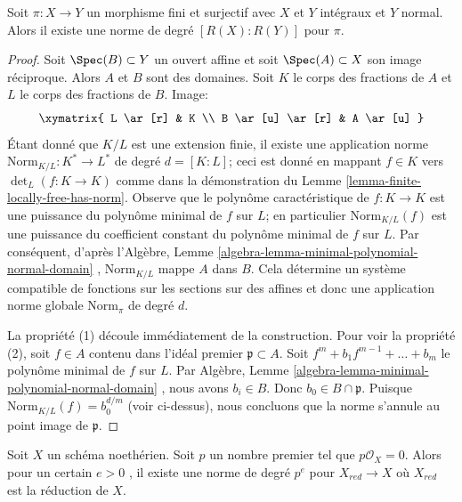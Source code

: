 \begin{lemma}
\label{lemma-norm-in-normal-case}
Soit  $\pi : X \to Y$  un morphisme fini et surjectif avec  $X$  et  $Y$ 
intégraux et  $Y$  normal. Alors il existe une norme de degré  $[R(X) : R(Y)]$ 
pour  $\pi$.
\end{lemma}

\begin{proof}
Soit  $\Spec(B) \subset Y$  un ouvert affine et soit  $\Spec(A) \subset X$  son image réciproque.
Alors  $A$  et  $B$  sont des domaines. Soit  $K$  le corps
des fractions de  $A$  et  $L$  le corps des fractions de
 $B$. Image:
$$
\xymatrix{
L \ar[r] & K \\
B \ar[u] \ar[r] & A \ar[u]
}
$$
Étant donné que  $K/L$  est une extension finie, il existe une application
norme  $\text{Norm}_{K/L} : K^* \to L^*$  de degré  $d = [K : L]$; ceci est donné en mappant  $f \in K$ 
vers  $\det_L(f : K \to K)$  comme dans la démonstration du Lemme  \ref{lemma-finite-locally-free-has-norm}. Observe que
le polynôme caractéristique de  $f : K \to K$  est une puissance du polynôme minimal
de  $f$  sur  $L$; en particulier  $\text{Norm}_{K/L}(f)$  est une puissance du
coefficient constant du polynôme minimal de  $f$  sur  $L$. Par
conséquent, d’après l’Algèbre, Lemme  \ref{algebra-lemma-minimal-polynomial-normal-domain} ,  $\text{Norm}_{K/L}$  mappe  $A$ 
dans  $B$. Cela détermine un système compatible de fonctions sur les
sections sur des affines et donc une application norme globale  $\text{Norm}_\pi$  de
degré  $d$.

\medskip\noindent
La propriété (1) découle immédiatement de la construction. Pour voir la propriété
(2), soit  $f \in A$  contenu dans l'idéal premier  $\mathfrak p \subset A$. Soit
 $f^m + b_1 f^{m - 1} + \ldots + b_m$  le polynôme minimal de  $f$  sur  $L$. Par Algèbre,
Lemme  \ref{algebra-lemma-minimal-polynomial-normal-domain} , nous avons  $b_i \in B$. Donc  $b_0 \in B \cap \mathfrak p$. Puisque
 $\text{Norm}_{K/L}(f) = b_0^{d/m}$  (voir ci-dessus), nous concluons que la norme s'annule au point image
de  $\mathfrak p$.
\end{proof}

\begin{lemma}
\label{lemma-Frobenius-gives-norm-for-reduction}
Soit  $X$  un schéma noethérien. Soit  $p$  un nombre premier tel
que  $p\mathcal{O}_X = 0$. Alors pour un certain  $e > 0$ , il existe une norme de degré
 $p^e$  pour  $X_{red} \to X$  où  $X_{red}$  est la réduction de  $X$.
\end{lemma}

